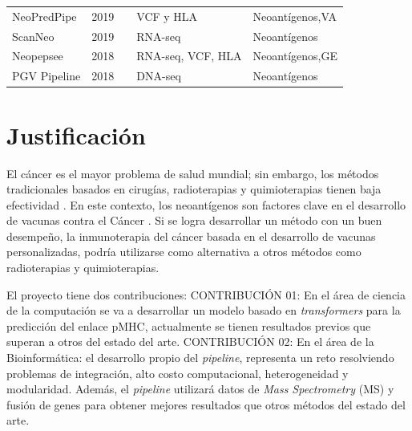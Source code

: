 \documentclass[a4paper,11pt]{article}
\begin{document}
\begin{table}[h]
{{\begin{tabular}{lllp{4.5cm}p{2.7cm}}
	NeoPredPipe     & 2019 &\cite{schenck2019neopredpipe}     & VCF y HLA                            & Neoantígenos,VA              \\
	
	ScanNeo         & 2019 &\cite{wang2019scanneo}            & RNA-seq                                                  & Neoantígenos                                       \\
	
		
	Neopepsee       & 2018 &\cite{kim2018neopepsee}           & RNA-seq, VCF, HLA  & Neoantígenos,GE    \\ 
	
	PGV Pipeline    & 2018 &\cite{rubinsteyn2018computational}& DNA-seq                                                  & Neoantígenos                                       \\
	

\end{tabular}
}	
}
\end{table}
















\section{Justificación}

El cáncer es el mayor problema de salud mundial; sin embargo, los métodos tradicionales basados en cirugías, radioterapias y quimioterapias tienen baja efectividad \citep{peng2019neoantigen}. En este contexto, los neoantígenos son factores clave en el desarrollo de vacunas contra el Cáncer  \citep{borden2022cancer,chen2021challenges,gopanenko2020main}. Si se logra desarrollar un método con un buen desempeño, la inmunoterapia del cáncer basada en el desarrollo de vacunas personalizadas, podría utilizarse como alternativa a otros métodos como radioterapias y quimioterapias. 

El proyecto tiene dos contribuciones: CONTRIBUCIÓN 01: En el área de ciencia de la computación se va a desarrollar un modelo basado en \textit{transformers} para la predicción del enlace pMHC, actualmente se tienen resultados previos que superan a otros del estado del arte. CONTRIBUCIÓN 02: En el área de la Bioinformática: el desarrollo propio del \textit{pipeline}, representa un reto resolviendo problemas de integración, alto costo computacional, heterogeneidad y modularidad. Además,  el \textit{pipeline} utilizará datos de \textit{Mass Spectrometry} (MS) y fusión de genes para obtener mejores resultados que otros métodos del estado del arte.
\end{document}
